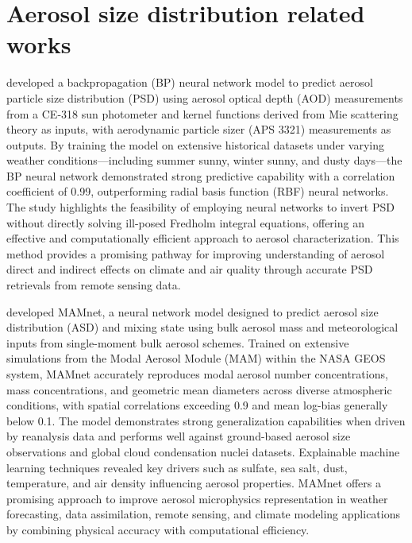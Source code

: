\documentclass[11pt]{article}
\begin{document}
\section{Aerosol size distribution related works}
\citet{ren2020prediction} developed a backpropagation (BP) neural network model to predict aerosol particle size distribution (PSD) using aerosol optical depth (AOD) measurements from a CE-318 sun photometer and kernel functions derived from Mie scattering theory as inputs, with aerodynamic particle sizer (APS 3321) measurements as outputs. By training the model on extensive historical datasets under varying weather conditions—including summer sunny, winter sunny, and dusty days—the BP neural network demonstrated strong predictive capability with a correlation coefficient of 0.99, outperforming radial basis function (RBF) neural networks. The study highlights the feasibility of employing neural networks to invert PSD without directly solving ill-posed Fredholm integral equations, offering an effective and computationally efficient approach to aerosol characterization. This method provides a promising pathway for improving understanding of aerosol direct and indirect effects on climate and air quality through accurate PSD retrievals from remote sensing data.

\citet{barahona2025deep} developed MAMnet, a neural network model designed to predict aerosol size distribution (ASD) and mixing state using bulk aerosol mass and meteorological inputs from single-moment bulk aerosol schemes. Trained on extensive simulations from the Modal Aerosol Module (MAM) within the NASA GEOS system, MAMnet accurately reproduces modal aerosol number concentrations, mass concentrations, and geometric mean diameters across diverse atmospheric conditions, with spatial correlations exceeding 0.9 and mean log-bias generally below 0.1. The model demonstrates strong generalization capabilities when driven by reanalysis data and performs well against ground-based aerosol size observations and global cloud condensation nuclei datasets. Explainable machine learning techniques revealed key drivers such as sulfate, sea salt, dust, temperature, and air density influencing aerosol properties. MAMnet offers a promising approach to improve aerosol microphysics representation in weather forecasting, data assimilation, remote sensing, and climate modeling applications by combining physical accuracy with computational efficiency.
\end{document}
